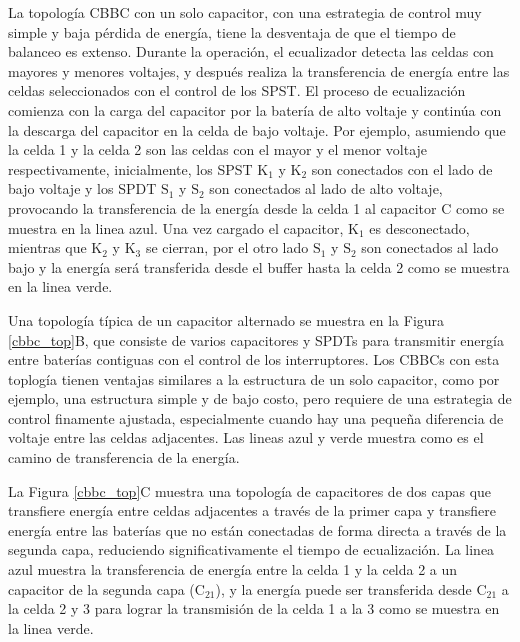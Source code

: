 \documentclass[10pt,a4paper]{article}
\begin{document}
La topolog\'ia \acrshort{CBBC} con un solo capacitor, con una estrategia de
control muy simple y baja p\'erdida de energ\'ia, tiene la desventaja de que el
tiempo de balanceo es extenso. Durante la operaci\'on, el ecualizador detecta
las celdas con mayores y menores voltajes, y despu\'es realiza la transferencia
de energ\'ia entre las celdas seleccionados con el control de los
\acrshort{SPST}. El proceso de ecualizaci\'on comienza con la carga del
capacitor por la bater\'ia de alto voltaje y contin\'ua con la descarga del
capacitor en la celda de bajo voltaje. Por ejemplo, asumiendo que la celda 1 y
la celda 2 son las celdas con el mayor y el menor voltaje respectivamente,
inicialmente, los \acrshort{SPST} $\mathrm{K_1}$ y $\mathrm{K_2}$ son conectados
con el lado de bajo voltaje y los \acrshort{SPDT} $\mathrm{S_1}$ y 
$\mathrm{S_2}$ son conectados al lado de alto voltaje, provocando la
transferencia de la energ\'ia desde la celda 1 al capacitor C como se muestra en
la linea azul. Una vez cargado el capacitor, $\mathrm{K_1}$ es desconectado,
mientras que $\mathrm{K_2}$ y $\mathrm{K_3}$ se cierran, por el otro lado
$\mathrm{S_1}$ y $\mathrm{S_2}$ son conectados al lado bajo y la energ\'ia
ser\'a transferida desde el buffer hasta la celda 2 como se muestra en la linea
verde.

Una topolog\'ia t\'ipica de un capacitor alternado se muestra en la Figura
\ref{cbbc_top}B, que consiste de varios capacitores y \acrshort{SPDT}s para
transmitir energ\'ia entre bater\'ias contiguas con el control de los
interruptores. Los \acrshort{CBBC}s con esta toplog\'ia tienen ventajas 
similares a la estructura de un solo capacitor, como por ejemplo, una estructura 
simple y de bajo costo, pero requiere de una estrategia de control finamente 
ajustada, especialmente cuando hay una pequeña diferencia de voltaje entre las 
celdas adjacentes. Las lineas azul y verde muestra como es el camino de 
transferencia de la energ\'ia.

La Figura \ref{cbbc_top}C muestra una topolog\'ia de capacitores de dos capas
que transfiere energ\'ia entre celdas adjacentes a trav\'es de la primer capa y
transfiere energ\'ia entre las bater\'ias que no est\'an conectadas de forma
directa a trav\'es de la segunda capa, reduciendo significativamente el tiempo
de ecualizaci\'on. La linea azul muestra la transferencia de energ\'ia entre la
celda 1 y la celda 2 a un capacitor de la segunda capa ($\mathrm{C_{21}}$), y la
energ\'ia puede ser transferida desde $\mathrm{C_{21}}$ a la celda 2 y 3 para
lograr la transmisi\'on de la celda 1 a la 3 como se muestra en la linea verde. 
\end{document}

